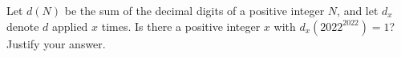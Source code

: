 Let $d(N)$ be the sum of the decimal digits of a positive integer $N$, and let $d_x$ denote $d$ applied $x$ times. Is there a positive integer $x$ with $d_x\!\left(2022^{2022}\right)=1$? Justify your answer.
